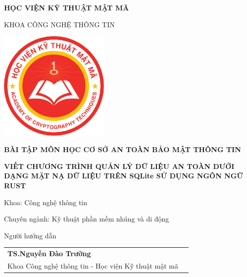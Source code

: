 \begin{titlepage}
	
	\begin{center}
		
		\textbf{HỌC VIỆN KỸ THUẬT MẬT MÃ}
		
		KHOA CÔNG NGHỆ THÔNG TIN
		
		\vspace{1cm}
		
		\includegraphics[width=0.4\textwidth]{images/kma.png}
		
		
		\vspace{2.2cm}
		
		\textbf{BÀI TẬP MÔN HỌC CƠ SỞ AN TOÀN BẢO MẬT THÔNG TIN}
		
		\vspace{0.2cm}
		
		\color{red}
		\textbf{VIẾT CHƯƠNG TRÌNH QUẢN LÝ DỮ LIỆU AN TOÀN DƯỚI DẠNG MẶT NẠ DỮ LIỆU TRÊN SQLite SỬ DỤNG NGÔN NGỮ RUST}
		
		
		
	\end{center}
	
	\begin{flushleft}        
		\hspace{3cm}
		Khoa: Công nghệ thông tin
		
		\hspace{3cm}
		Chuyên ngành: Kỹ thuật phần mềm nhúng và di động
		
		
		\vfill
		
		\hspace{3cm}
		
		\hspace{3cm}Người hướng dẫn
		
		\begin{tabular}{l c}
			
			\hspace{4cm}\textbf{TS.Nguyễn Đào Trường} \\
			
			\hspace{4cm}Khoa Công nghệ thông tin - Học viện Kỹ thuật mật mã
			

\end{tabular}
\end{flushleft}
\end{titlepage}
